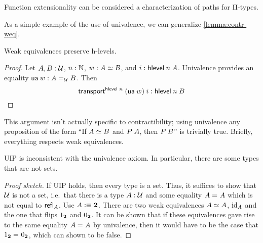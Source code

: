 \documentclass[./thesis.tex]{subfiles}
\begin{document}
Function extensionality can be considered a characterization of paths for Π-types.

As a simple example of the use of univalence, we can generalize
\cref{lemma:contr-weq}.

\begin{theorem}
	Weak equivalences preserve h-levels.
\end{theorem}
\begin{proof}
  Let $A,B:\mathcal{U}$, $n:\mathbb{N}$, $w:A \simeq B$, and $i:\mathsf{hlevel}\hspace{0.25em} n \hspace{0.25em} A$.
	Univalence provides an equality $\mathsf{ua}\hspace{0.25em} w:A =_{\mathcal{U}} B$. 
  Then
  \begin{equation*}
    \mathsf{transport}^{\mathsf{hlevel}\hspace{0.25em} n}\hspace{0.25em} (\mathsf{ua}\hspace{0.25em} w) \hspace{0.25em} i : \mathsf{hlevel}\hspace{0.25em} n \hspace{0.25em} B
  \end{equation*}
\end{proof}

This argument isn't actually specific to contractibility; using univalence any
proposition of the form ``If $A \simeq B$ and $P\hspace{0.25em} A$, then $P\hspace{0.25em} B$''
is trivially true. Briefly, everything respects weak equivalences.

\begin{theorem}
	UIP is inconsistent with the univalence axiom. In particular, there are some
  types that are not sets.
\end{theorem}
\begin{proof}[Proof sketch]
  If UIP holds, then every type is a set. Thus, it suffices to show that $\mathcal{U}$
  is not a set, i.e.\ that there is a type $A:\mathcal{U}$ and some equality
  $A =_{} A$ which is not equal to $\mathsf{refl}_{A}$. Use $A\vcentcolon\equiv\mathbf{2}$.
  There are two weak equivalences $A \simeq A$, $\operatorname{id}_A$ and the one that flips
  $1_{\mathbf{2}}$ and $0_{\mathbf{2}}$. It can be shown that if these equivalences gave rise
  to the same equality $A =_{} A$ by univalence, then it would have to be
  the case that $1_{\mathbf{2}} =_{} 0_{\mathbf{2}}$, which can shown to be false.
\end{proof}
\end{document}
